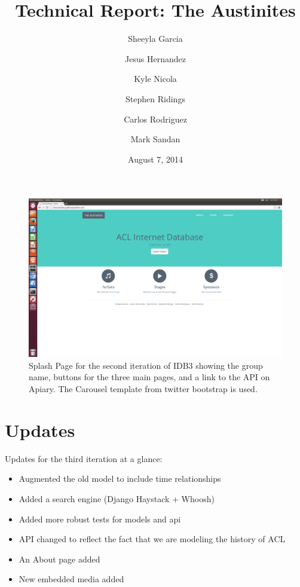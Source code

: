 \documentclass[12pt,english]{scrartcl}
\title{Technical Report: The Austinites}
\author{
  Sheeyla Garcia\\
  \and
  Jesus Hernandez\\
  \and
  Kyle Nicola\\
  \and
  Stephen Ridings\\
  \and
  Carlos Rodriguez\\
  \and
  Mark Sandan\\  
}
\date{ August 7, 2014 }
\begin{document}
\thispagestyle{plain}
\maketitle
\tableofcontents

\begin{figure}[h!]
\includegraphics[width=\textwidth]{home.png}
 \caption{Splash Page for the second iteration of IDB3 showing the group name, buttons for the three main pages, and a link to the API on Apiary. The Carousel template from twitter bootstrap is used.}
\end{figure}

\section{Updates}
Updates for the third iteration at a glance:
\begin{itemize}
 \item Augmented the old model to include time relationships  
\end{itemize}
\begin{itemize}
 \item Added a search engine (Django Haystack + Whoosh)
\end{itemize}
\begin{itemize}
 \item Added more robust tests for models and api
\end{itemize}
\begin{itemize}
 \item API changed to reflect the fact that we are modeling the history of ACL
\end{itemize}
\begin{itemize}
 \item An About page added 
\end{itemize}
\begin{itemize}
 \item New embedded media added
\end{itemize}
\end{document}
